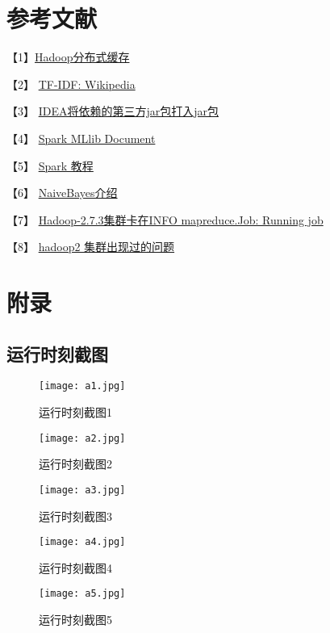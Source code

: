 \documentclass[lang=cn,11pt]{elegantpaper}
\begin{document}
\section{参考文献}
【1】\href{https://www.cnblogs.com/loveling-0239/p/7884195.html}{Hadoop分布式缓存}\par
【2】 \href{https://en.wikipedia.org/wiki/Tf%E2%80%93idf}{TF-IDF: Wikipedia} \par
【3】 \href{https://blog.csdn.net/qq_41571900/article/details/85069055}{IDEA将依赖的第三方jar包打入jar包} \par
【4】 \href{http://spark.apache.org/docs/latest/ml-features.html}{Spark MLlib Document}\par
【5】 \href{http://dblab.xmu.edu.cn/blog/spark/}{Spark 教程}\par
【6】 \href{https://nlp.stanford.edu/IR-book/html/htmledition/naive-bayes-text-classification-1.html}{NaiveBayes介绍}\par
【7】 \href{https://blog.csdn.net/SCGH_Fx/article/details/60783466}{Hadoop-2.7.3集群卡在INFO mapreduce.Job: Running job}\par
【8】 \href{https://blog.csdn.net/iteye_3893/article/details/82636364}{hadoop2 集群出现过的问题}
\appendix
 \section{附录}
 \subsection{运行时刻截图}

 \begin{figure}[!htb]
	\centering
	\texttt{[image: a1.jpg]}
	\caption{运行时刻截图1 \label{fig:feature-out}}
\end{figure} 


\begin{figure}[!htb]
	\centering
	\texttt{[image: a2.jpg]}
	\caption{运行时刻截图2 \label{fig:feature-out}}
\end{figure} 

\begin{figure}[!htb]
	\centering
	\texttt{[image: a3.jpg]}
	\caption{运行时刻截图3 \label{fig:feature-out}}
\end{figure} 

\begin{figure}[!htb]
	\centering
	\texttt{[image: a4.jpg]}
	\caption{运行时刻截图4 \label{fig:feature-out}}
\end{figure} 

\begin{figure}[!htb]
	\centering
	\texttt{[image: a5.jpg]}
	\caption{运行时刻截图5 \label{fig:feature-out}}
\end{figure} 
\end{document}

